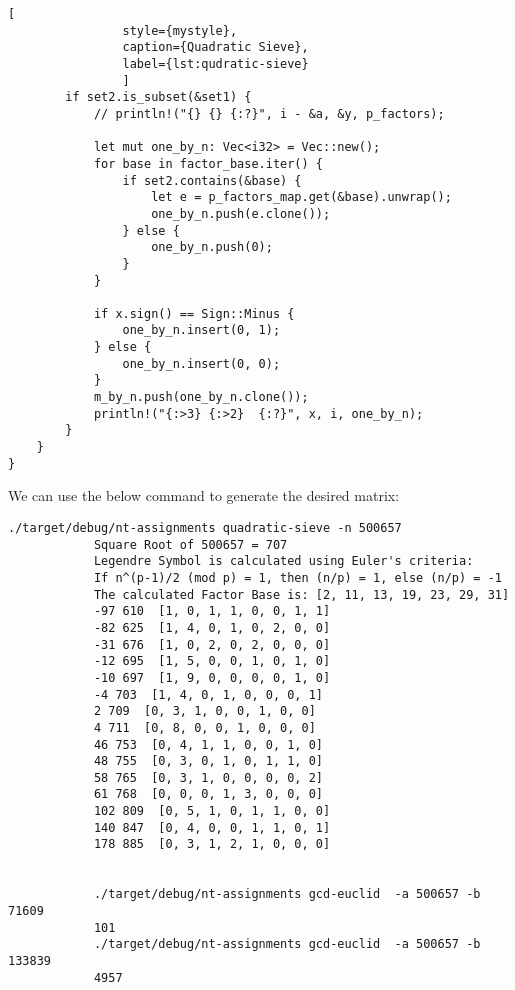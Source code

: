 \documentclass[11pt,a4paper,fleqn]{article}
\begin{document}
\begin{enumerate}[1.]
\begin{flushleft}
\begin{enumerate}[Step 1.]
\begin{lstlisting}[
                style={mystyle},
                caption={Quadratic Sieve},
                label={lst:qudratic-sieve}
                ]
        if set2.is_subset(&set1) {
            // println!("{} {} {:?}", i - &a, &y, p_factors);

            let mut one_by_n: Vec<i32> = Vec::new();
            for base in factor_base.iter() {
                if set2.contains(&base) {
                    let e = p_factors_map.get(&base).unwrap();
                    one_by_n.push(e.clone());
                } else {
                    one_by_n.push(0);
                }
            }

            if x.sign() == Sign::Minus {
                one_by_n.insert(0, 1);
            } else {
                one_by_n.insert(0, 0);
            }
            m_by_n.push(one_by_n.clone());
            println!("{:>3} {:>2}  {:?}", x, i, one_by_n);
        }
    }
}
                \end{lstlisting}

                \bigbreak
                We can use the below command to generate the desired matrix:
                \begin{lstlisting}[style=DOS, caption=Quadratic Sieve Matrix Generation]
            ./target/debug/nt-assignments quadratic-sieve -n 500657
            Square Root of 500657 = 707
            Legendre Symbol is calculated using Euler's criteria:
            If n^(p-1)/2 (mod p) = 1, then (n/p) = 1, else (n/p) = -1
            The calculated Factor Base is: [2, 11, 13, 19, 23, 29, 31]
            -97 610  [1, 0, 1, 1, 0, 0, 1, 1]
            -82 625  [1, 4, 0, 1, 0, 2, 0, 0]
            -31 676  [1, 0, 2, 0, 2, 0, 0, 0]
            -12 695  [1, 5, 0, 0, 1, 0, 1, 0]
            -10 697  [1, 9, 0, 0, 0, 0, 1, 0]
            -4 703  [1, 4, 0, 1, 0, 0, 0, 1]
            2 709  [0, 3, 1, 0, 0, 1, 0, 0]
            4 711  [0, 8, 0, 0, 1, 0, 0, 0]
            46 753  [0, 4, 1, 1, 0, 0, 1, 0]
            48 755  [0, 3, 0, 1, 0, 1, 1, 0]
            58 765  [0, 3, 1, 0, 0, 0, 0, 2]
            61 768  [0, 0, 0, 1, 3, 0, 0, 0]
            102 809  [0, 5, 1, 0, 1, 1, 0, 0]
            140 847  [0, 4, 0, 0, 1, 1, 0, 1]
            178 885  [0, 3, 1, 2, 1, 0, 0, 0]


            ./target/debug/nt-assignments gcd-euclid  -a 500657 -b 71609
            101
            ./target/debug/nt-assignments gcd-euclid  -a 500657 -b 133839
            4957
                \end{lstlisting}
            \end{enumerate}
		\end{flushleft}


\end{enumerate}
\end{document}
